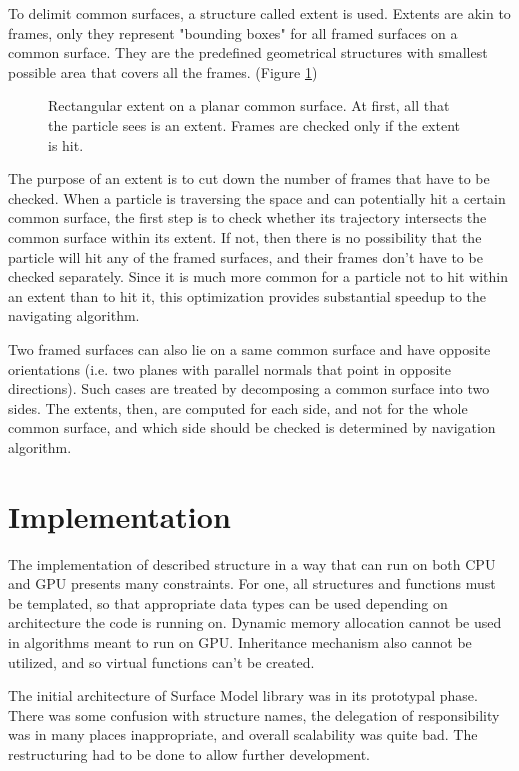 \documentclass[12pt, a4paper]{article}
\begin{document}
To delimit common surfaces, a structure called extent is used. Extents are akin to frames, only they represent "bounding boxes" for all framed surfaces on a common surface. They are the predefined geometrical structures with smallest possible area that covers all the frames. (Figure \ref{fig:extent})
\begin{figure}[h]
	\centering
	
	\caption{Rectangular extent on a planar common surface. At first, all that the particle sees is an extent. Frames are checked only if the extent is hit.}
	\label{fig:extent}
\end{figure}

The purpose of an extent is to cut down the number of frames that have to be checked. When a particle is traversing the space and can potentially hit a certain common surface, the first step is to check whether its trajectory intersects the common surface within its extent. If not, then there is no possibility that the particle will hit any of the framed surfaces, and their frames don't have to be checked separately. Since it is much more common for a particle not to hit within an extent than to hit it, this optimization provides substantial speedup to the navigating algorithm.

Two framed surfaces can also lie on a same common surface and have opposite orientations (i.e. two planes with parallel normals that point in opposite directions). Such cases are treated by decomposing a common surface into two sides. The extents, then, are computed for each side, and not for the whole common surface, and which side should be checked is determined by navigation algorithm.


\section{Implementation}

The implementation of described structure in a way that can run on both CPU and GPU presents many constraints. For one, all structures and functions must be templated, so that appropriate data types can be used depending on architecture the code is running on. Dynamic memory allocation cannot be used in algorithms meant to run on GPU. Inheritance mechanism also cannot be utilized, and so virtual functions can't be created.

The initial architecture of Surface Model library was in its prototypal phase. There was some confusion with structure names, the delegation of responsibility was in many places inappropriate, and overall scalability was quite bad. The restructuring had to be done to allow further development.
\end{document}
